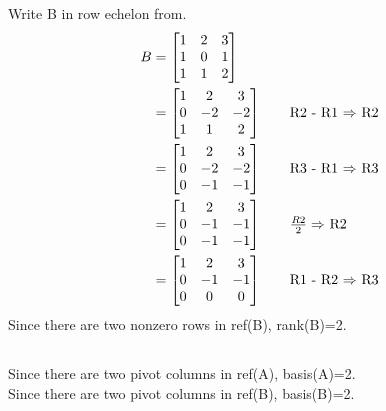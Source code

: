 Write B in row echelon from.
\begin{align*}
    B 
    &= \begin{bmatrix}
	1 & 2 & 3 \\
	1 & 0 & 1 \\
	1 & 1 & 2
    \end{bmatrix} \\
    &= \begin{bmatrix}
	1 & 2 & 3 \\
	0 & -2 & -2 \\
	1 & 1 & 2
    \end{bmatrix} \tag*{R2 - R1 $\Rightarrow$ R2} \\
    &= \begin{bmatrix}
	1 & 2 & 3 \\
	0 & -2 & -2 \\
	0 & -1 & -1
    \end{bmatrix} \tag*{R3 - R1 $\Rightarrow$ R3} \\
    &= \begin{bmatrix}
	1 & 2 & 3 \\
	0 & -1 & -1 \\
	0 & -1 & -1
    \end{bmatrix} \tag*{$\frac{R2}{2} \Rightarrow$ R2} \\
    &= \begin{bmatrix}
	1 & 2 & 3 \\
	0 & -1 & -1 \\
	0 & 0 & 0
    \end{bmatrix} \tag*{R1 - R2 $\Rightarrow$ R3} 
\end{align*}
Since there are two nonzero rows in ref(B), rank(B)=2.

\subsection{}
Since there are two pivot columns in ref(A), basis(A)=2.
\\
Since there are two pivot columns in ref(B), basis(B)=2.

